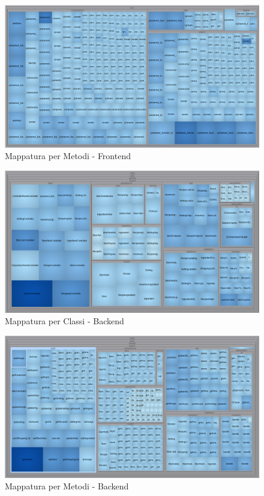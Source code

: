 \documentclass[a4paper,12pt]{report}
\begin{document}
		\begin{figure}[!h]
			\centering
			\includegraphics[width=1\linewidth]{image/F-Metodi.png}
			\caption{Mappatura per Metodi - Frontend}\label{fig:F-Metodi}
		\end{figure}    

		\begin{figure}[!h]
			\centering
			\includegraphics[width=1\linewidth]{image/B-Classi.png}
			\caption{Mappatura per Classi - Backend}\label{fig:B-Classi}
		\end{figure}    

		\begin{figure}[!h]
			\centering
			\includegraphics[width=1\linewidth]{image/B-Metodi.png}
			\caption{Mappatura per Metodi - Backend}\label{fig:B-Metodi}
		\end{figure}    
		
\end{document}
